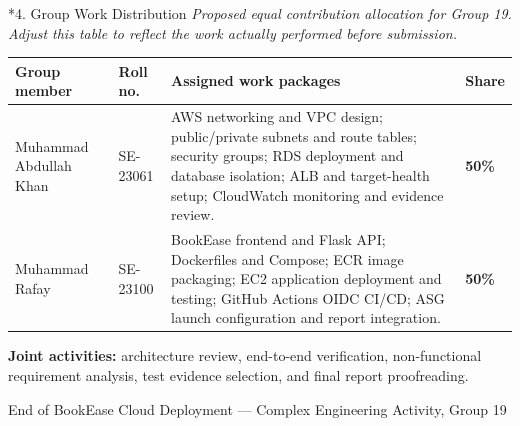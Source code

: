 \documentclass[10pt,a4paper]{article}
\makeatletter
\renewcommand{\section}{\@startsection{section}{1}{0pt}{11pt}{5pt}{\normalfont\large\bfseries\color{navy}}}
\makeatother
\begin{document}
\section*{4. Group Work Distribution}
\textit{Proposed equal contribution allocation for Group 19. Adjust this table to reflect the work actually performed before submission.}
\vspace{6mm}
\small\begin{tabularx}{\linewidth}{@{}p{34mm}p{21mm}X p{14mm}@{}}
\toprule
\textbf{Group member} & \textbf{Roll no.} & \textbf{Assigned work packages} & \textbf{Share}\\
\midrule
Muhammad Abdullah Khan & SE-23061 & AWS networking and VPC design; public/private subnets and route tables; security groups; RDS deployment and database isolation; ALB and target-health setup; CloudWatch monitoring and evidence review. & \textbf{50\%}\\
\addlinespace
Muhammad Rafay & SE-23100 & BookEase frontend and Flask API; Dockerfiles and Compose; ECR image packaging; EC2 application deployment and testing; GitHub Actions OIDC CI/CD; ASG launch configuration and report integration. & \textbf{50\%}\\
\bottomrule
\end{tabularx}\normalsize
\vspace{9mm}
\textbf{Joint activities:} architecture review, end-to-end verification, non-functional requirement analysis, test evidence selection, and final report proofreading.
\vfill
\begin{center}\small\textcolor{muted}{End of BookEase Cloud Deployment --- Complex Engineering Activity, Group 19}\end{center}
\end{document}
